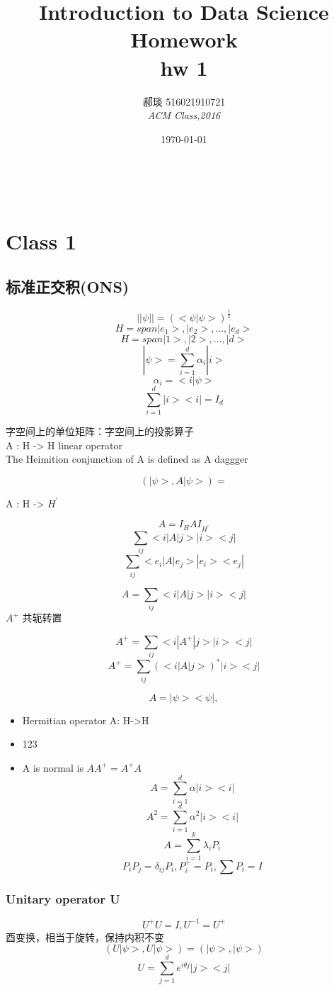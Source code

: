 \documentclass[a4paper, 11pt]{article} %
\title{\textbf{Introduction to Data Science Homework}\\ %
hw 1} %
\author{\textsc{郝琰 516021910721} %
\\{\textit{ACM Class,2016}}} %
\date{\today} %
\makeatletter
\renewcommand{\maketitle}{ %

\begin{flushright} %
{\LARGE\@title} %

\vspace{50pt} %

{\large\@author} %
\\\@date %

\vspace{10pt} %
\end{flushright}
}
\makeatother
\begin{document}
\maketitle %

\section*{Class 1}

\subsection{标准正交积(ONS)}
$$
||\psi|| = (<\psi|\psi>)^{\frac{1}{2}}
$$
$$
H = span  |e_1>, |e_2> , ... , |e_d>
$$
$$
H = span  |1>, |2> , ... , |d>
$$
$$
|\psi> = \sum^d_{i = 1}\alpha _i |i>
$$
$$
\alpha_i = <i | \psi>
$$
$$
\sum^d_{i = 1} |i><i| = I_d
$$

字空间上的单位矩阵：字空间上的投影算子\\

A : H -> H linear operator\\

The Heimition conjunction of A is defined as A daggger

$$
(|\psi >, A |\psi >) = 
$$

A : H -> $H^{'}$

$$
A = I_HAI_{H^{'}}
$$
$$
\sum_{ij}<i|A|j> |i><j|
$$
$$
\sum_{ij}<e_i|A|e_j> |e_i><e_j|
$$

$$
A = \sum_{ij}<i|A|j> |i><j|
$$
$A^{+}$ 共轭转置

$$
A^{+} = \sum_{ij}<i|A^{+}|j> |i><j|
$$
$$
A^{+} = \sum_{ij}(<i|A|j>)^{*} |i><j|
$$

$$
A = |\psi><\psi|,  
$$
\begin{itemize}
\item Hermitian operator A: H->H
\item 123
\item A is normal is $AA^{+} = A^{+}A$
 $$
A = \sum^d_{i = 1} \alpha |i><i|
$$
$$
A^2 = \sum^d_{i =1} \alpha^2 |i><i|
$$
$$
A = \sum^k_{i=1} \lambda_iP_i
$$
$$
P_iP_j = \delta_{ij}P_i, P_i^{+} = P_i , \sum P_i = I
$$
\end{itemize}

\subsubsection*{Unitary operator U}
$$
U^{+}U = I , U^{-1} = U^{+}
$$
酉变换，相当于旋转，保持内积不变
$$
(U|\psi>,U|\psi>) = (|\psi>,|\psi>)
$$
$$
U = \sum^d_{j = 1}e^{i\theta j} |j><j|
$$
\end{document}

